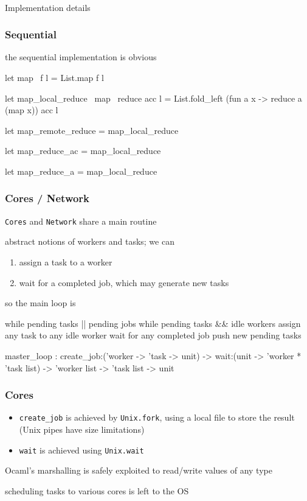 \documentclass{beamer}
\let\emph\alert
\begin{document}
\begin{frame}
  \begin{center}
    \hrulefill\\
    \emph{Implementation details}
  \end{center}
\end{frame}

\begin{frame}\frametitle{Sequential}
the sequential implementation is obvious

  \begin{ocaml}
let map ~f l = List.map f l

let map_local_reduce ~map ~reduce acc l =
  List.fold_left (fun a x -> reduce a (map x)) acc l

let map_remote_reduce = map_local_reduce

let map_reduce_ac = map_local_reduce

let map_reduce_a = map_local_reduce
  \end{ocaml}
\end{frame}

\begin{frame}\frametitle{Cores / Network}

  \texttt{Cores} and \texttt{Network} share a main routine

  abstract notions of \emph{workers} and \emph{tasks}; we can
  \begin{enumerate}
  \item assign a task to a worker
  \item wait for a completed job, which may generate new tasks
  \end{enumerate}


  so the main loop is
  \begin{lightblue-tt}
    while pending tasks || pending jobs
      while pending tasks && idle workers
        assign any task to any idle worker
      wait for any completed job
        push new pending tasks
  \end{lightblue-tt}


  \begin{ocaml}
master_loop : 
  create_job:('worker -> 'task -> unit) -> 
  wait:(unit -> 'worker * 'task list) -> 
  'worker list -> 'task list -> unit
  \end{ocaml}
\end{frame}

\begin{frame}\frametitle{Cores}
  \begin{itemize}\item 
    \texttt{create\_job} is achieved by \texttt{Unix.fork}, using a
    local file to store the result (Unix pipes have size limitations)

  \item 
    \texttt{wait} is achieved using \texttt{Unix.wait}
  \end{itemize}



  Ocaml's marshalling is safely exploited to read/write values of any type


  scheduling tasks to various cores is left to the OS
\end{frame}
\end{document}
